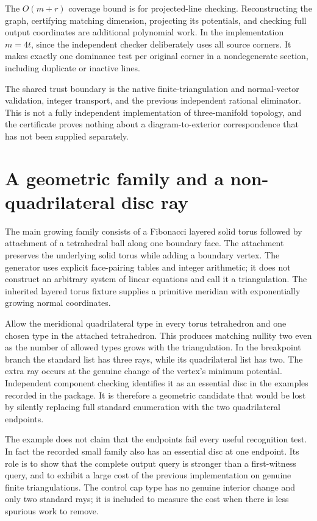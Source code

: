 \documentclass[11pt]{article}
\theoremstyle{definition}
\theoremstyle{remark}
\begin{document}
The $O(m+r)$ coverage bound is for projected-line checking. Reconstructing
the graph, certifying matching dimension, projecting its potentials, and
checking full output coordinates are additional polynomial work. In the
implementation $m=4t$, since the independent checker deliberately uses all
source corners. It makes exactly one dominance test per original corner in
a nondegenerate section, including duplicate or inactive lines.

The shared trust boundary is the native finite-triangulation and normal-vector
validation, integer transport, and the previous independent rational
eliminator. This is not a fully independent implementation of three-manifold
topology, and the certificate proves nothing about a diagram-to-exterior
correspondence that has not been supplied separately.

\section{A geometric family and a non-quadrilateral disc ray}
\label{sec:example}

The main growing family consists of a Fibonacci layered solid torus followed
by attachment of a tetrahedral ball along one boundary face. The attachment
preserves the underlying solid torus while adding a boundary vertex. The
generator uses explicit face-pairing tables and integer arithmetic; it does
not construct an arbitrary system of linear equations and call it a
triangulation. The inherited layered torus fixture supplies a primitive
meridian with exponentially growing normal coordinates.\cite{repo,report57}

Allow the meridional quadrilateral type in every torus tetrahedron and one
chosen type in the attached tetrahedron. This produces matching nullity two
even as the number of allowed types grows with the triangulation. In the
breakpoint branch the standard list has three rays, while its quadrilateral
list has two. The extra ray occurs at the genuine change of the vertex's
minimum potential. Independent component checking identifies it as an
essential disc in the examples recorded in the package. It is therefore a
geometric candidate that would be lost by silently replacing full standard
enumeration with the two quadrilateral endpoints.



The example does not claim that the endpoints fail every useful recognition
test. In fact the recorded small family also has an essential disc at one
endpoint. Its role is to show that the complete output query is stronger
than a first-witness query, and to exhibit a large cost of the previous
implementation on genuine finite triangulations. The control cap type has
no genuine interior change and only two standard rays; it is included to
measure the cost when there is less spurious work to remove.
\end{document}
